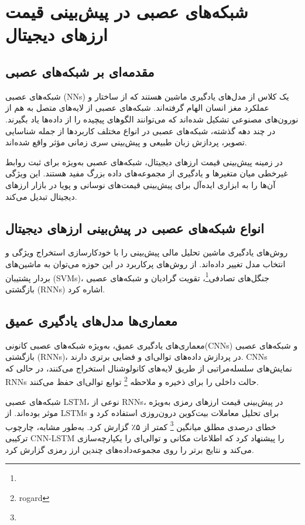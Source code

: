 {\section{شبکه‌های عصبی در پیش‌بینی قیمت ارزهای دیجیتال}

\subsection{مقدمه‌ای بر شبکه‌های عصبی}
شبکه‌های عصبی (NNs) یک کلاس از مدل‌های یادگیری ماشین هستند که از ساختار و عملکرد مغز انسان الهام گرفته‌اند. شبکه‌های عصبی از لایه‌های متصل به هم از نورون‌های مصنوعی تشکیل شده‌اند که می‌توانند الگوهای پیچیده را از داده‌ها یاد بگیرند. در چند دهه گذشته، شبکه‌های عصبی در انواع مختلف کاربردها از جمله شناسایی تصویر، پردازش زبان طبیعی و پیش‌بینی سری زمانی مؤثر واقع شده‌اند.

در زمینه پیش‌بینی قیمت ارزهای دیجیتال، شبکه‌های عصبی به‌ویژه برای ثبت روابط غیرخطی میان متغیرها و یادگیری از مجموعه‌های داده بزرگ مفید هستند. این ویژگی آن‌ها را به ابزاری ایده‌آل برای پیش‌بینی قیمت‌های نوسانی و پویا در بازار ارزهای دیجیتال تبدیل می‌کند.

\subsection{انواع شبکه‌های عصبی در پیش‌بینی ارزهای دیجیتال}
روش‌های یادگیری ماشین تحلیل مالی پیش‌بینی را با خودکارسازی استخراج ویژگی و انتخاب مدل تغییر داده‌اند. از روش‌های پرکاربرد در این حوزه می‌توان به ماشین‌های بردار پشتیبان (SVMs)، جنگل‌های تصادفی\footnote{}، تقویت گرادیان و شبکه‌های عصبی بازگشتی (RNNs) اشاره کرد.


\subsection{معماری‌ها مدل‌های یادگیری عمیق}
معماری‌های یادگیری عمیق، به‌ویژه شبکه‌های عصبی کانونی(CNNs) و شبکه‌های عصبی بازگشتی (RNNs)، در پردازش داده‌های توالی‌ای و فضایی برتری دارند. CNNs نمایش‌های سلسله‌مراتبی از طریق لایه‌های کانولوشنال استخراج می‌کنند، در حالی که RNNs حالت داخلی را برای ذخیره و ملاحظه \footnote{rogard} توابع توالی‌ای حفظ می‌کنند.

شبکه‌های عصبی LSTM، نوعی از RNNs، در پیش‌بینی قیمت ارزهای رمزی به‌ویژه موثر بوده‌اند. \cite{hsu2018predicting} از LSTMs برای تحلیل معاملات بیت‌کوین درون‌روزی استفاده کرد و خطای درصدی مطلق میانگین  \footnote{} کمتر از ۵٪ گزارش کرد. به‌طور مشابه، \cite{zhang2021hybrid} چارچوب ترکیبی CNN-LSTM را پیشنهاد کرد که اطلاعات مکانی و توالی‌ای را یکپارچه‌سازی می‌کند و نتایج برتر را روی مجموعه‌داده‌های چندین ارز رمزی گزارش کرد.

}
